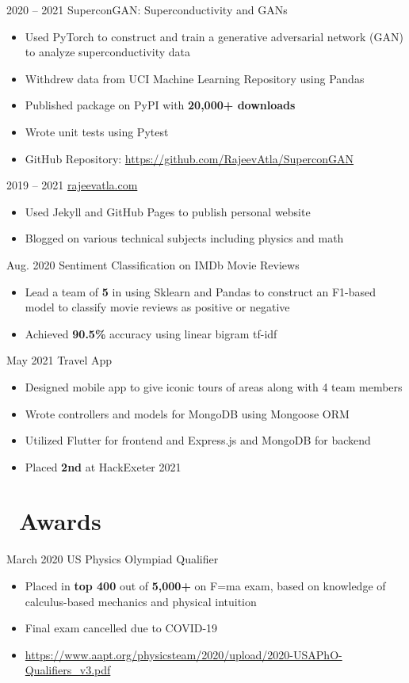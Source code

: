 \documentclass[12]{article}
\begin{document}
\entry
{2020 -- 2021}
{SuperconGAN: Superconductivity and GANs}
{
  \begin{itemize}
  \item Used PyTorch to construct and train a generative adversarial network (GAN) to analyze superconductivity data
  \item Withdrew data from UCI Machine Learning Repository using Pandas
  \item Published package on PyPI with \textbf{20,000+ downloads}
  \item Wrote unit tests using Pytest
  \item GitHub Repository: \url{https://github.com/RajeevAtla/SuperconGAN}
  \end{itemize}
}

\entry
{2019 -- 2021}
{\url{rajeevatla.com}}
{
  \begin{itemize}
  \item Used Jekyll and GitHub Pages to publish personal website
  \item Blogged on various technical subjects including physics and math
  \end{itemize}
}

\entry
{Aug. 2020}
{Sentiment Classification on IMDb Movie Reviews}
{
  \begin{itemize}
  \item Lead a team of \textbf{5} in using Sklearn and Pandas to construct an F1-based model to classify movie reviews as positive or negative
  \item Achieved \textbf{90.5\%} accuracy using linear bigram tf-idf
  \end{itemize}
}

\entry
{May 2021}
{Travel App}
{
  \begin{itemize}
  \item Designed mobile app to give iconic tours of areas along with 4 team members
  \item Wrote controllers and models for MongoDB using Mongoose ORM
  \item Utilized Flutter for frontend and Express.js and MongoDB for backend
  \item Placed \textbf{2nd} at HackExeter 2021
  \end{itemize}
}


\section{\faAward\ Awards}

\entry
{March 2020}
{US Physics Olympiad Qualifier}
{
  \begin{itemize}
  \item Placed in \textbf{top 400} out of \textbf{5,000+} on F=ma exam, based on knowledge of calculus-based mechanics and physical intuition
  \item Final exam cancelled due to COVID-19
  \item \url{https://www.aapt.org/physicsteam/2020/upload/2020-USAPhO-Qualifiers\_v3.pdf}
  \end{itemize}
}
\end{document}

